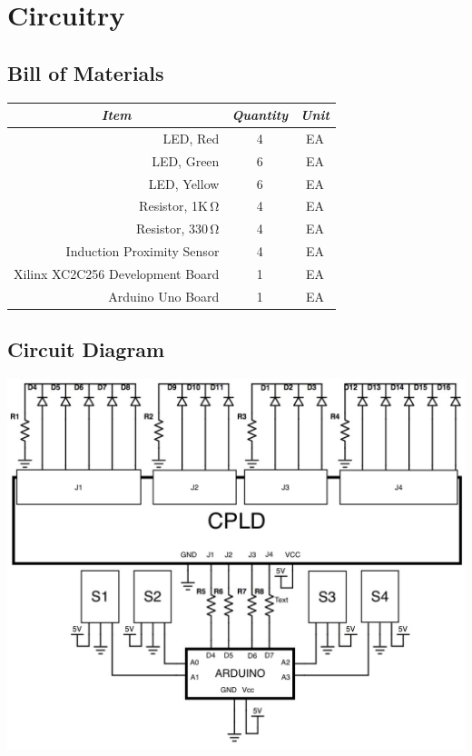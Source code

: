\section{Circuitry}
\subsection{Bill of Materials}
\begin{table}[h]
\begin{tabular}{|r|c|c|}
\hline
\multicolumn{1}{|c|}{\textit{Item}} & \textit{Quantity} & \textit{Unit} \\ \hline
LED, Red & 4 & EA \\ \hline
LED, Green & 6 & EA \\ \hline
LED, Yellow & 6 & EA \\ \hline
Resistor, 1K$\,\mathrm\Omega$ & 4 & EA \\ \hline
Resistor, 330$\,\mathrm\Omega$ & 4 & EA \\ \hline
Induction Proximity Sensor & 4 & EA \\ \hline
Xilinx XC2C256 Development Board & 1 & EA \\ \hline
Arduino Uno Board & 1 & EA \\ \hline
\end{tabular}
\end{table}

\subsection{Circuit Diagram}
\includegraphics[scale=0.50]{0623151841.jpg}

